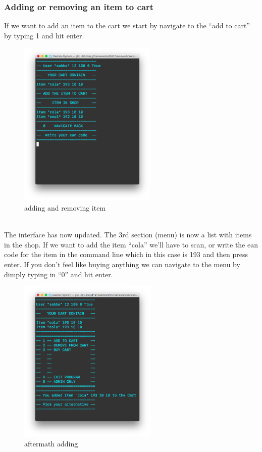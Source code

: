 \documentclass[11pt]{article}
\begin{document}
\subsubsection{Adding or removing an item to cart}
If we want to add an item to the cart we start by navigate to the “add to cart” by typing 1 and hit enter.
\\
\begin{figure}[h!]
  \includegraphics[width=250px]{interface3.png}
  \caption{adding and removing item}
\end{figure}
\\
\newpage
The interface has now updated. The 3rd section (menu) is now a list with items in the shop. If we want to add the item “cola” we’ll have to scan, or write the ean code for the item in the command line which in this case is 193 and then press enter. If you don’t feel like buying anything we can navigate to the menu by dimply typing in “0” and hit enter.
\\
\begin{figure}[h!]
  \includegraphics[width=250px]{interface4.png}
  \caption{aftermath adding}
\end{figure}
\end{document}
